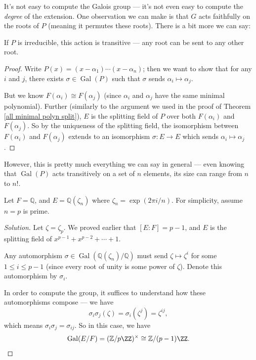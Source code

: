 It's not easy to compute the Galois group --- it's not even easy to compute the \emph{degree} of the extension. One observation we can make is that $G$ acts faithfully on the roots of $P$ (meaning it permutes these roots). There is a bit more we can say:

\begin{proposition}
    If $P$ is irreducible, this action is transitive --- any root can be sent to any other root. 
\end{proposition}

\begin{proof}
    Write $P(x) = (x - \alpha_1)\cdots (x - \alpha_n)$; then we want to show that for any $i$ and $j$, there exists $\sigma \in \operatorname{Gal}(P)$ such that $\sigma$ sends $\alpha_i \mapsto \alpha_j$. 
    
    But we know $F(\alpha_i) \cong F(\alpha_j)$ (since $\alpha_i$ and $\alpha_j$ have the same minimal polynomial). Further (similarly to the argument we used in the proof of Theorem \ref{all minimal polyn split}), $E$ is the splitting field of $P$ over both $F(\alpha_i)$ and $F(\alpha_j)$. So by the uniqueness of the splitting field, the isomorphism between $F(\alpha_i)$ and $F(\alpha_j)$ extends to an isomorphism $\sigma : E \to E$ which sends $\alpha_i \mapsto \alpha_j$.  
\end{proof}

However, this is pretty much everything we can say in general --- even knowing that $\operatorname{Gal}(P)$ acts transitively on a set of $n$ elements, its size can range from $n$ to $n!$. 

\begin{example}
    Let $F = \mathbb{Q}$, and $E = \mathbb{Q}(\zeta_n)$ where $\zeta_n = \exp(2\pi i/n)$. For simplicity, assume $n = p$ is prime. 
\end{example}

\begin{proof}[Solution]
    Let $\zeta = \zeta_p$. We proved earlier that $[E : F] = p - 1$, and $E$ is the splitting field of $x^{p - 1} + x^{p - 2} + \cdots + 1$. 

    Any automorphism $\sigma \in \operatorname{Gal}(\mathbb{Q}(\zeta_n)/\mathbb{Q})$ must send $\zeta \mapsto \zeta^i$ for some $1 \leq i \leq p - 1$ (since every root of unity is some power of $\zeta$). Denote this automorphism by $\sigma_i$.

    In order to compute the group, it suffices to understand how these automorphisms compose --- we have \[\sigma_i\sigma_j(\zeta) = \sigma_i(\zeta^j) = \zeta^{ij},\] which means $\sigma_i\sigma_j = \sigma_{ij}$. So in this case, we have \[\operatorname{Gal}(E/F) = (\mathbb{Z}/p\ZZ)^\times \cong \mathbb{Z}/(p - 1)\ZZ.\qedhere\] 
\end{proof}

